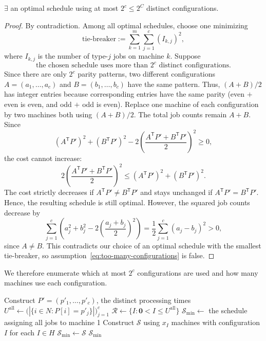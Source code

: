 \documentclass[12pt,a4paper]{article}
\theoremstyle{definition}
\theoremstyle{plain}
\begin{document}
\begin{lemma}
\label{lem:scheduling-few-configurations}
$\exists$ an optimal schedule using at most $2^c\leq2^C$ distinct configurations.
\end{lemma}
\begin{proof}
By contradiction. Among all optimal schedules, choose one minimizing
\[
\text{tie-breaker}:=\sum_{k=1}^{m}\sum_{j=1}^{c}(I_{k,j})^2,
\]
where $I_{k,j}$ is the number of type-$j$ jobs on machine $k$.
Suppose
\begin{equation}
\label{eq:too-many-configurations}
\text{the chosen schedule uses more than }2^c\text{ distinct configurations}.
\end{equation}
Since there are only $2^c$ parity patterns, two different configurations
$A=(a_1,\ldots,a_c)$ and $B=(b_1,\ldots,b_c)$ have the same pattern.
Thus, $(A+B)/2$ has integer entries because corresponding entries have
the same parity (even $+$ even is even, and odd $+$ odd is even).
Replace one machine of each
configuration by two machines both using $(A+B)/2$.
The total job counts remain $A+B$. Since
\[
(A^{\mathsf T}P')^2+(B^{\mathsf T}P')^2
-2\left(\frac{A^{\mathsf T}P'+B^{\mathsf T}P'}{2}\right)^2\geq0,
\]
the cost cannot increase:
\[
2\left(\frac{A^{\mathsf T}P'+B^{\mathsf T}P'}{2}\right)^2
\leq(A^{\mathsf T}P')^2+(B^{\mathsf T}P')^2.
\]
The cost strictly decreases if $A^{\mathsf T}P'\neq B^{\mathsf T}P'$
and stays unchanged if $A^{\mathsf T}P'=B^{\mathsf T}P'$.
Hence, the resulting schedule is still optimal. However, the squared
job counts decrease by
\[
\sum_{j=1}^{c}\left(a_j^2+b_j^2
-2\left(\frac{a_j+b_j}{2}\right)^2\right)
=\frac12\sum_{j=1}^{c}(a_j-b_j)^2>0,
\]
since $A\neq B$. This contradicts our choice of an optimal schedule with
the smallest tie-breaker, so assumption~\eqref{eq:too-many-configurations}
is false.
\end{proof}

We therefore enumerate which at most $2^c$ configurations are used and
how many machines use each configuration.

\begin{algorithm}[htbp]
\caption{$\textit{Exact-Scheduling}_C(\mathcal{I})$}
\begin{algorithmic}[1]
\State Construct $P'=(p'_1,\ldots,p'_c)$, the distinct processing times
\State $U^{\mathrm{all}}\gets\bigl(|\{i\in N:P[i]=p'_j\}|\bigr)_{j=1}^{c}$
\State $\mathcal{R}\gets\{I:\mathbf{0}<I\leq U^{\mathrm{all}}\}$
\State $\mathcal{S}_{\min}\gets$ the schedule assigning all jobs to machine 1
\State Construct $\mathcal{S}$ using $x_I$ machines with configuration $I$ for each $I\in H$
\State $\mathcal{S}_{\min}\gets\mathcal{S}$
\EndIf
\EndIf
\EndFor
\EndFor
\State \Return $\mathcal{S}_{\min}$
\end{algorithmic}
\end{algorithm}
\end{document}
